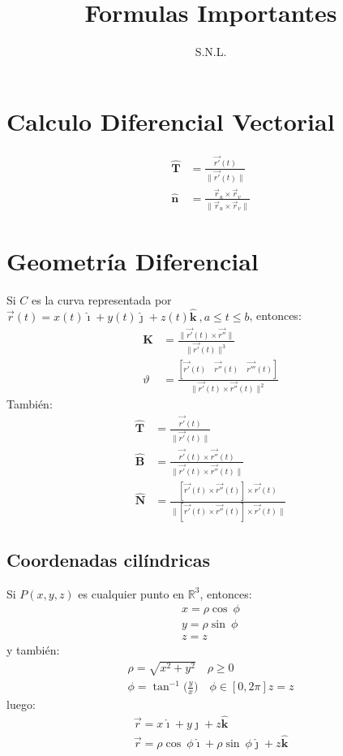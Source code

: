 \documentclass[a4paper]{article}
\title{Formulas Importantes}
\author{S.N.L.}
\newcommand{\ihat}{\boldsymbol{\hat{\imath}}}
\newcommand{\jhat}{\boldsymbol{\hat{\jmath}}}
\newcommand{\khat}{\boldsymbol{\hat{\bm{k}}}}
\begin{document}
\maketitle
\section{Calculo Diferencial Vectorial}
\begin{align*}
\mathbf{\hat{T}}&=\frac{\vec{r'}(t)}{\lVert \vec{r'}(t)\rVert}\\
\mathbf{\hat{n}}&=\frac{\vec{r}_u\times\vec{r}_v}{\rVert\vec{r}_u\times\vec{r}_v\rVert}
\end{align*}
\section{Geometría Diferencial}
Si $C$ es la curva representada por $\vec{r}(t)=x(t)\ihat+y(t)\jhat+z(t)\khat\ ,a\leq t\leq b$, entonces:
\begin{align*}
\mathbf{K}&=\frac{\lVert \vec{r'}(t)\times\vec{r''}\rVert}{\lVert \vec{r'}(t)\rVert^3}\\
\vartheta&=\frac{[\vec{r'}(t)\quad\vec{r''}(t)\quad\vec{r'''}(t)]}{\lVert \vec{r'}(t)\times\vec{r''}(t)\rVert^2}
\end{align*}
También:
\begin{align*}
\mathbf{\hat{T}}&=\frac{\vec{r'}(t)}{\lVert \vec{r'}(t)\rVert}\\
\mathbf{\hat{B}}&=\frac{\vec{r'}(t)\times\vec{r''}(t)}{\rVert \vec{r'}(t)\times\vec{r''}(t)\lVert}\\
\mathbf{\hat{N}}&=\frac{[\vec{r'}(t)\times\vec{r''}(t)]\times\vec{r'}(t)}{\lVert [\vec{r'}(t)\times\vec{r''}(t)]\times\vec{r'}(t)\rVert}
\end{align*}
\subsection{Coordenadas cilíndricas}
Si $P(x,y,z)$ es cualquier punto en $\mathbb{R}^3$, entonces:
\begin{gather*}
x=\rho\cos\ \phi\\
y=\rho\sin\ \phi\\
z=z
\end{gather*}
y también:
\begin{gather*}
\rho=\sqrt{x^2+y^2}\quad\rho\geq 0\\
\phi=\tan^{-1}\Big(\frac{y}{x}\Big)\quad\phi\in[0,2\pi] 
z=z
\end{gather*}
luego:
\begin{gather}
\tag{Sistema cartesiano}
\vec{r}=x\ihat+y\jhat+z\khat\\
\tag{Sistema cilindrico}
\vec{r}=\rho\cos\ \phi\ihat+\rho\sin\ \phi\jhat+z\khat
\end{gather}
\end{document}
